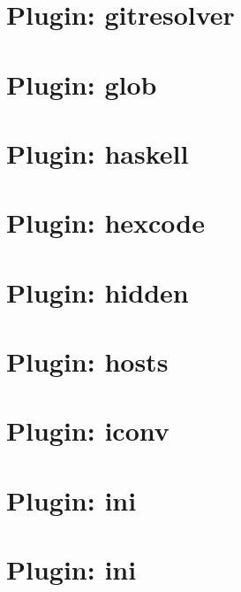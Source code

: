 \documentclass[twoside]{book}
\newcommand{\+}{\discretionary{\mbox{\scriptsize$\hookleftarrow$}}{}{}}
\begin{document}
\chapter{Plugin\+: gitresolver}
\label{md_src_plugins_gitresolver_README}

\chapter{Plugin\+: glob}
\label{md_src_plugins_glob_README}

\chapter{Plugin\+: haskell}
\label{md_src_plugins_haskell_README}

\chapter{Plugin\+: hexcode}
\label{md_src_plugins_hexcode_README}

\chapter{Plugin\+: hidden}
\label{md_src_plugins_hidden_README}

\chapter{Plugin\+: hosts}
\label{md_src_plugins_hosts_README}

\chapter{Plugin\+: iconv}
\label{md_src_plugins_iconv_README}

\chapter{Plugin\+: ini}
\label{md_src_plugins_ini_crash_test_crash_test}

\chapter{Plugin\+: ini}
\label{md_src_plugins_ini_README}

\end{document}
